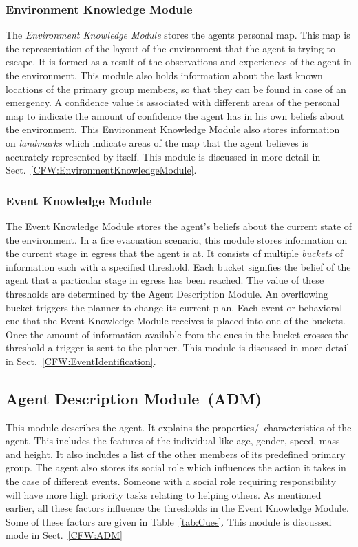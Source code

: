 \subsubsection{Environment Knowledge Module}
\label{IBEVAC:EnvironmentKnowledgeModule}
The \emph{Environment Knowledge Module} stores the agents personal map. This map is the representation of the layout of the environment that the agent is trying to escape. It is formed as a result of the observations and experiences of the agent in the environment. This module also holds information about the last known locations of the primary group members, so that they can be found in case of an emergency. A confidence value is associated with different areas of the personal map to indicate the amount of confidence the agent has in his own beliefs about the environment. This Environment Knowledge Module also stores information on \emph{landmarks} which indicate areas of the map that the agent believes is accurately represented by itself. This module is discussed in more detail in Sect.~\ref{CFW:EnvironmentKnowledgeModule}.

\subsubsection{Event Knowledge Module}
\label{IBEVAC:EventKnowledgeModule}
The Event Knowledge Module stores the agent's beliefs about the current state of the environment. In a fire evacuation scenario, this module stores information on the current stage in egress that the agent is at. It consists of multiple \emph{buckets} of information each with a specified threshold. Each bucket signifies the belief of the agent that a particular stage in egress has been reached. The value of these thresholds are determined by the Agent Description Module. An overflowing bucket triggers the planner to change its current plan. Each event or behavioral cue that the Event Knowledge Module receives is placed into one of the buckets. Once the amount of information available from the cues in the bucket crosses the threshold a trigger is sent to the planner. This module is discussed in more detail in Sect.~\ref{CFW:EventIdentification}.

\subsection{Agent Description Module~(ADM)}
\label{IBEVAC:AgentDescriptionModule}

This module describes the agent. It explains the properties/~characteristics of the agent. This includes the features of the individual like age, gender, speed, mass and height. It also includes a list of the other members of its predefined primary group. The agent also stores its social role which influences the action it takes in the case of different events. Someone with a social role requiring responsibility will have more high priority tasks relating to helping others. As mentioned earlier, all these factors influence the thresholds in the Event Knowledge Module. Some of these factors are given in Table~\ref{tab:Cues}. This module is discussed mode in Sect.~\ref{CFW:ADM}

